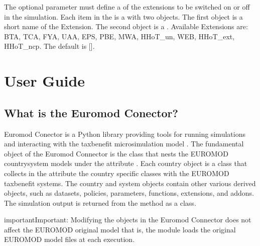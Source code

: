 \documentclass[letterpaper,10pt,english]{sphinxmanual}
\begin{document}
\sphinxAtStartPar
The optional parameter  must define a  of the   extensions  to be switched on or off in the simulation. Each item in the  is   a  with two objects. The first object is a  short name of the Extension. The second object is a .  Available Extensions are: BTA, TCA, FYA, UAA, EPS, PBE, MWA, HHoT\_un, WEB, HHoT\_ext, HHoT\_ncp. The default is {[}{]}.

\sphinxstepscope


\section{User Guide}
\label{\detokenize{notebooks/userguide:user-guide}}\label{\detokenize{notebooks/userguide::doc}}

\subsection{What is the Euromod Conector?}
\label{\detokenize{notebooks/userguide:what-is-the-euromod-conector}}
\sphinxAtStartPar
Euromod Conector is a Python library providing tools for running simulations and interacting with the tax\sphinxhyphen{}benefit microsimulation model .
The fundamental object of the Euromod Connector is the  class that nests the EUROMOD country\sphinxhyphen{}system models under the attribute . Each country object is a  class that collects in the  attribute the country specific  classes with the EUROMOD tax\sphinxhyphen{}benefit systems. The country and system objects contain other various derived objects, such as datasets, policies, parameters, functions, extensions, and add\sphinxhyphen{}ons.
The simulation output is returned from the  method as a  class.

\begin{sphinxadmonition}{important}{Important:}
\sphinxAtStartPar
Modifying the objects in the Euromod Connector does not affect the EUROMOD original model that is, the  module loads the original EUROMOD model files at each execution.
\end{sphinxadmonition}
\end{document}
